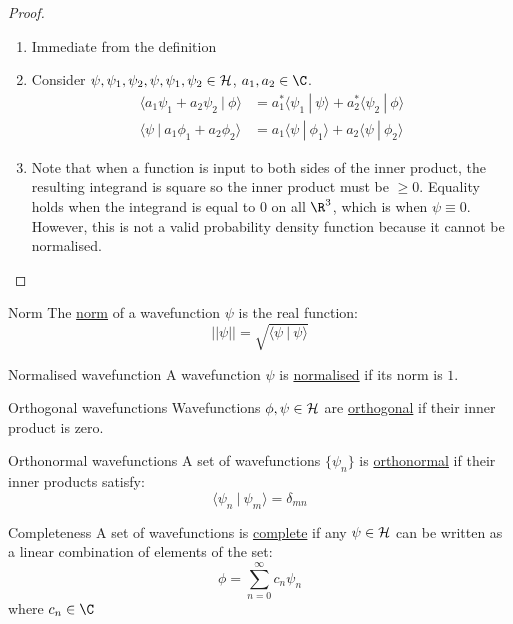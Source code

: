 \documentclass[../Main.tex]{subfiles}
\begin{document}
\begin{proof}
    \begin{enumerate}
        \item Immediate from the definition
        \item Consider $\psi, \psi_1, \psi_2, \psi, \psi_1, \psi_2 \in \mathcal{H}$, $a_1, a_2 \in \C$.
            \begin{align*}
                \langle a_1 \psi_1 + a_2 \psi_2 ~|~ \phi\rangle &= a_1^* \langle \psi_1~|~\psi\rangle + a_2^* \langle \psi_2~|~\phi\rangle \\
                \langle \psi~|~a_1 \phi_1 + a_2 \phi_2\rangle &= a_1 \langle \psi~|~\phi_1\rangle + a_2 \langle \psi~|~\phi_2\rangle
            \end{align*}
        \item Note that when a function is input to both sides of the inner product, the resulting integrand is square so the inner product must be $\geq 0$. Equality holds when the integrand is equal to $0$ on all $\R^3$, which is when $\psi \equiv 0$. However, this is not a valid probability density function because it cannot be normalised.
    \end{enumerate}
\end{proof}
\begin{definition}{Norm}
    The \underline{norm} of a wavefunction $\psi$ is the real function:
    \begin{equation}
        ||\psi|| = \sqrt{\langle \psi~|~\psi\rangle}
        \label{eqnWFNorm}
    \end{equation}
\end{definition}
\begin{definition}{Normalised wavefunction}
    A wavefunction $\psi$ is \underline{normalised} if its norm is $1$.
\end{definition}
\begin{definition}{Orthogonal wavefunctions}
    Wavefunctions $\phi, \psi \in \mathcal{H}$ are  \underline{orthogonal} if their inner product is zero.
\end{definition}
\begin{definition}{Orthonormal wavefunctions}
    A set of wavefunctions $\{\psi_n\}$ is  \underline{orthonormal} if their inner products satisfy:
    \begin{equation*}
        \langle \psi_n~|~\psi_m\rangle = \delta_{mn}
    \end{equation*}
\end{definition}
\begin{definition}{Completeness}
    A set of wavefunctions is \underline{complete} if any $\psi \in \mathcal{H}$ can be written as a linear combination of elements of the set:
    \begin{equation}
        \phi = \sum_{n = 0}^{\infty} c_n \psi_n
        \label{eqnHilbLinCombo}
    \end{equation}
    where $c_n \in \C$
\end{definition}
\end{document}
